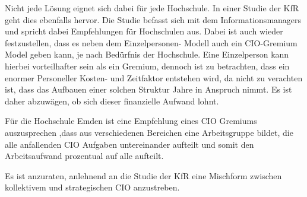 Nicht jede Lösung eignet sich dabei für jede Hochschule. 
In einer Studie der KfR geht dies ebenfalls hervor. 
Die Studie befasst sich mit dem Informationsmanagers und spricht dabei Empfehlungen für Hochschulen aus. 
Dabei ist auch wieder festzustellen, dass es neben dem Einzelpersonen- Modell auch ein CIO-Gremium Model geben kann, je nach Bedürfnis der Hochschule. 
Eine Einzelperson kann hierbei vorteilhafter sein als ein Gremium, dennoch ist zu betrachten, dass ein enormer Personeller Kosten- und Zeitfaktor entstehen wird, da nicht zu verachten ist, dass das Aufbauen einer solchen Struktur Jahre in Anspruch nimmt. 
Es ist daher abzuwägen, ob sich dieser finanzielle Aufwand lohnt.

Für die Hochschule Emden ist eine Empfehlung eines CIO Gremiums auszusprechen ,dass aus verschiedenen Bereichen eine Arbeitsgruppe bildet, die alle anfallenden CIO Aufgaben untereinander aufteilt und somit den Arbeitsaufwand prozentual auf alle aufteilt. 

Es ist anzuraten, anlehnend an die Studie der KfR eine Mischform zwischen kollektivem und strategischen CIO anzustreben.
